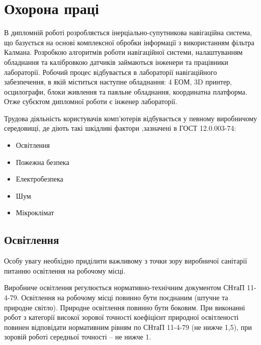 % 
% 
% 
% 

\section{Охорона праці}

В дипломній роботі розробляється інерціально-супутникова навігаційна система, що базується на
основі комплексної обробки інформації з використанням фільтра Калмана. Розробкою алгоритмів роботи
навігаційної системи, налаштуванням обладнання та калібровкою датчиків займаються інженери та 
працівники лабораторії. Робочий процес відбувається в лабораторії навігаційного забезпечення, 
в якій міститься наступне обладнання: 4 ЕОМ, 3D принтер, осцилографи, блоки живлення та паяльне 
обладнання, координатна платформа. Отже субєктом дипломної роботи є інженер лабораторії.

Трудова діяльність користувачів комп’ютерів відбувається у певному виробничому середовищі, де 
діють такі шкідливі фактори ,зазначені в ГОСТ 12.0.003-74: 
\begin{itemize}
  \item Освітлення 
  \item Пожежна безпека
  \item Електробезпека
  \item Шум
  \item Мікроклімат
\end{itemize}




\subsection{Освітлення}
Особу увагу необхідно приділити важливому з точки зору виробничої санітарії 
питанню освітлення на робочому місці.

Виробниче освітлення регулюється нормативно-технічним документом  СНтаП 11-4-79. 
Освітлення на робочому місці повинно бути поєднаним (штучне та природне світло). 
Природне освітлення повинно бути боковим. При виконанні робот з категорії високої 
зорової точності коефіцієнт природної освітленості повинен відповідати нормативним 
рівням по СНтаП 11-4-79 (не нижче 1,5), при зоровій роботі середньої точності – не нижче 1.


